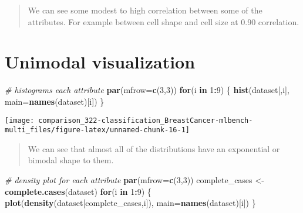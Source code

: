 \documentclass[]{book}
\newenvironment{Shaded}{\begin{snugshade}}{\end{snugshade}}
\newcommand{\CommentTok}[1]{\textcolor[rgb]{0.56,0.35,0.01}{\textit{#1}}}
\newcommand{\ControlFlowTok}[1]{\textcolor[rgb]{0.13,0.29,0.53}{\textbf{#1}}}
\newcommand{\DataTypeTok}[1]{\textcolor[rgb]{0.13,0.29,0.53}{#1}}
\newcommand{\DecValTok}[1]{\textcolor[rgb]{0.00,0.00,0.81}{#1}}
\newcommand{\KeywordTok}[1]{\textcolor[rgb]{0.13,0.29,0.53}{\textbf{#1}}}
\newcommand{\NormalTok}[1]{#1}
\newcommand{\OperatorTok}[1]{\textcolor[rgb]{0.81,0.36,0.00}{\textbf{#1}}}
\newcommand{\StringTok}[1]{\textcolor[rgb]{0.31,0.60,0.02}{#1}}
\begin{document}
\begin{quote}
We can see some modest to high correlation between some of the attributes. For example between cell shape and cell size at 0.90 correlation.
\end{quote}

\hypertarget{unimodal-visualization}{%
\section{Unimodal visualization}\label{unimodal-visualization}}

\begin{Shaded}
\begin{Highlighting}[]
\CommentTok{# histograms each attribute}
\KeywordTok{par}\NormalTok{(}\DataTypeTok{mfrow=}\KeywordTok{c}\NormalTok{(}\DecValTok{3}\NormalTok{,}\DecValTok{3}\NormalTok{))}
\ControlFlowTok{for}\NormalTok{(i }\ControlFlowTok{in} \DecValTok{1}\OperatorTok{:}\DecValTok{9}\NormalTok{) \{}
    \KeywordTok{hist}\NormalTok{(dataset[,i], }\DataTypeTok{main=}\KeywordTok{names}\NormalTok{(dataset)[i])}
\NormalTok{\}}
\end{Highlighting}
\end{Shaded}

\begin{center}\texttt{[image: comparison\_322-classification\_BreastCancer-mlbench-multi\_files/figure-latex/unnamed-chunk-16-1]} \end{center}

\begin{quote}
We can see that almost all of the distributions have an exponential or bimodal shape to them.
\end{quote}

\begin{Shaded}
\begin{Highlighting}[]
\CommentTok{# density plot for each attribute}
\KeywordTok{par}\NormalTok{(}\DataTypeTok{mfrow=}\KeywordTok{c}\NormalTok{(}\DecValTok{3}\NormalTok{,}\DecValTok{3}\NormalTok{))}
\NormalTok{complete_cases <-}\StringTok{ }\KeywordTok{complete.cases}\NormalTok{(dataset)}
\ControlFlowTok{for}\NormalTok{(i }\ControlFlowTok{in} \DecValTok{1}\OperatorTok{:}\DecValTok{9}\NormalTok{) \{}
    \KeywordTok{plot}\NormalTok{(}\KeywordTok{density}\NormalTok{(dataset[complete_cases,i]), }\DataTypeTok{main=}\KeywordTok{names}\NormalTok{(dataset)[i])}
\NormalTok{\}}
\end{Highlighting}
\end{Shaded}
\end{document}
